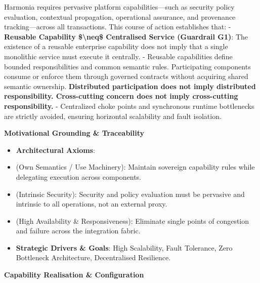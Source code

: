 Harmonia requires pervasive platform capabilities—such as security policy evaluation, contextual propagation, operational assurance, and provenance tracking—across all transactions. This course of action establishes that:
- \textbf{Reusable Capability \$\textbackslash{}neq\$ Centralised Service (Guardrail G1)}: The existence of a reusable enterprise capability does not imply that a single monolithic service must execute it centrally.
- Reusable capabilities define bounded responsibilities and common semantic rules. Participating components consume or enforce them through governed contracts without acquiring shared semantic ownership. \textbf{Distributed participation does not imply distributed responsibility. Cross-cutting concern does not imply cross-cutting responsibility.}
- Centralized choke points and synchronous runtime bottlenecks are strictly avoided, ensuring horizontal scalability and fault isolation.



\par\medskip\textbf{Motivational Grounding \& Traceability}\par


\begin{itemize}


\item \textbf{Architectural Axioms}:

\item \texttt{} (Own Semantics / Use Machinery): Maintain sovereign capability rules while delegating execution across components.

\item \texttt{} (Intrinsic Security): Security and policy evaluation must be pervasive and intrinsic to all operations, not an external proxy.

\item \texttt{} (High Availability \& Responsiveness): Eliminate single points of congestion and failure across the integration fabric.

\item \textbf{Strategic Drivers \& Goals}: High Scalability, Fault Tolerance, Zero Bottleneck Architecture, Decentralised Resilience.

\end{itemize}


\par\medskip\textbf{Capability Realisation \& Configuration}\par


